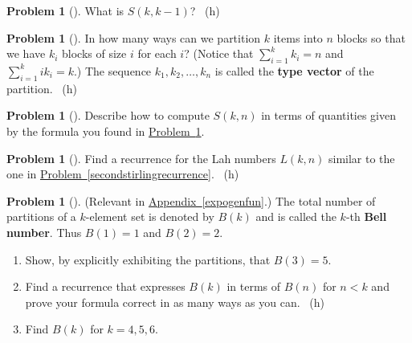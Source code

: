 \documentclass[10pt,]{book}
\newcommand{\terminology}[1]{\textbf{#1}}
\theoremstyle{plain}
\theoremstyle{definition}
\newtheorem{activity}[project]{Problem}
\theoremstyle{definition}
\numberwithin{equation}{chapter}
\newcommand{\importantarrow}{\Rightarrow}
\newcommand{\lt}{<}
\begin{document}
\begin{activity}[] \label{activity-138}
\hypertarget{p-807}{}%
What is \(S(k,k-1)\)?%
~{\tiny (h)}\end{activity}
\begin{activity}[] \label{partitionsgivenpartsize}
\hypertarget{p-810}{}%
In how many ways can we partition \(k\) items into \(n\) blocks so that we have \(k_i\) blocks of size \(i\) for each \(i\)? (Notice that \(\sum_{i=1}^k k_i = n\) and \(\sum_{i=1}^k ik_i = k\).) The sequence \(k_1,k_2,\ldots,k_n\) is called the \terminology{type vector} of the partition.%
~{\tiny (h)}\end{activity}
\begin{activity}[] \label{activity-140}
\hypertarget{p-813}{}%
Describe how to compute \(S(k,n)\) in terms of quantities given by the formula you found in \hyperref[partitionsgivenpartsize]{Problem~\ref{partitionsgivenpartsize}}.%
\end{activity}
\begin{activity}[]\marginsymbol[-1em]{\pdftooltip{$\importantarrow$}{especially interesting}} \label{activity-141}
\hypertarget{p-815}{}%
Find a recurrence for the Lah numbers \(L(k,n)\) similar to the one in \hyperref[secondstirlingrecurrence]{Problem~\ref{secondstirlingrecurrence}}.%
~{\tiny (h)}\end{activity}
\begin{activity}[] \label{BellNumberIntro}
\hypertarget{p-818}{}%
(Relevant in \hyperref[expogenfun]{Appendix~\ref{expogenfun}}.) The total number of partitions of a \(k\)-element set is denoted by \(B(k)\) and is called the \(k\)-th \terminology{Bell number}. Thus \(B(1)=1\) and \(B(2) =2\).%
\begin{enumerate}[font=\bfseries,label=(\alph*),ref=\alph*]
\item\label{task-108} \marginsymbol[-2.5em]{} \hypertarget{p-819}{}%
Show, by explicitly exhibiting the partitions, that \(B(3)=5\).%
\item\label{task-109} \marginsymbol[-2.5em]{} \hypertarget{p-821}{}%
Find a recurrence that expresses \(B(k)\) in terms of \(B(n)\) for \(n\lt  k\) and prove your formula correct in as many ways as you can.%
~{\tiny (h)}\item\label{task-110} \marginsymbol[-2.5em]{} \hypertarget{p-825}{}%
Find \(B(k)\) for \(k=4,5,6\).%
\end{enumerate}
\end{activity}
\typeout{************************************************}
\typeout{************************************************}
\end{document}
